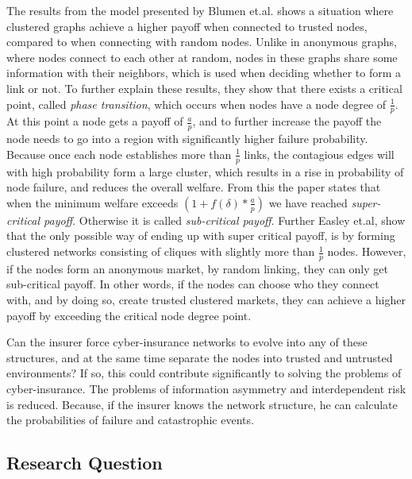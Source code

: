 The results from the model presented by Blumen et.al. shows a situation where clustered graphs achieve a higher payoff when connected to trusted nodes, compared to when connecting with random nodes. Unlike in anonymous graphs, where nodes connect to each other at random, nodes in these graphs share some information with their neighbors, which is used when deciding whether to form a link or not. 
To further explain these results, they show that there exists a critical point, called \textit{phase transition}, which occurs when nodes have a node degree of $\frac{1}{p}$. 
At this point a node gets a payoff of $\frac{a}{p}$, and to further increase the payoff the node needs to go into a region with significantly higher failure probability. 
Because once each node establishes more than $\frac{1}{p}$ links, the contagious edges will with high probability form a large cluster, which results in a rise in probability of node failure, and reduces the overall welfare.
From this the paper states that when the minimum welfare exceeds 
$(1+f(\delta)*\frac{a}{p})$
we have reached \textit{super-critical payoff}. Otherwise it is called \textit{sub-critical payoff}. 
Further Easley et.al, show that the only possible way of ending up with super critical payoff, is by forming clustered networks consisting of cliques with slightly more than $\frac{1}{p}$ nodes. 
However, if the nodes form an anonymous market, by random linking, they can only get sub-critical payoff. 
In other words, if the nodes can choose who they connect with, and by doing so, create trusted clustered markets, they can achieve a higher payoff by exceeding the critical node degree point. 

 Can the insurer force cyber-insurance networks to evolve into any of these structures, and at the same time separate the nodes into trusted and untrusted environments? 
If so, this could contribute significantly to solving the problems of cyber-insurance. The problems of information asymmetry and interdependent risk is reduced. Because, if the insurer knows the network structure, he can calculate the probabilities of failure and catastrophic events. 

\subsection{Research Question}

